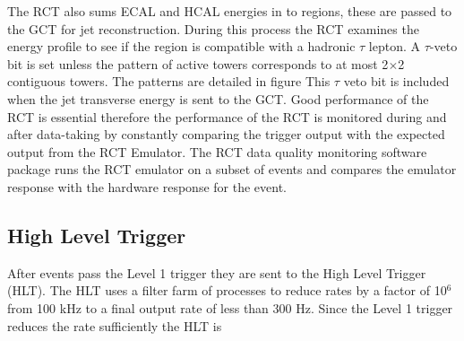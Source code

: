 The RCT also sums ECAL and HCAL energies in to regions, these are passed
to the GCT for jet reconstruction. During this process the RCT examines the
energy profile to see if the region is compatible with a hadronic $\tau$ lepton.
A $\tau$-veto bit is set unless the pattern of active towers corresponds to at
most 2$\times$2 contiguous towers. The patterns are detailed in figure %
This $\tau$ veto bit is included when the jet transverse energy is sent to the GCT.
Good performance of the RCT is essential therefore the performance of the RCT%
is monitored during and after data-taking by constantly comparing the trigger 
output with the expected output from the RCT Emulator. The RCT data quality monitoring 
software package runs the RCT emulator on a subset of events and compares
the emulator response with the hardware response for the event.

  \subsection{High Level Trigger}
After events pass the Level 1 trigger they are sent to the High Level Trigger (HLT). The
HLT uses a filter farm of processes to reduce rates by a factor of 10$^{6}$ from 
100 kHz to a final output rate of less than 300 Hz. Since the Level 1 trigger reduces
the rate sufficiently the HLT is 
